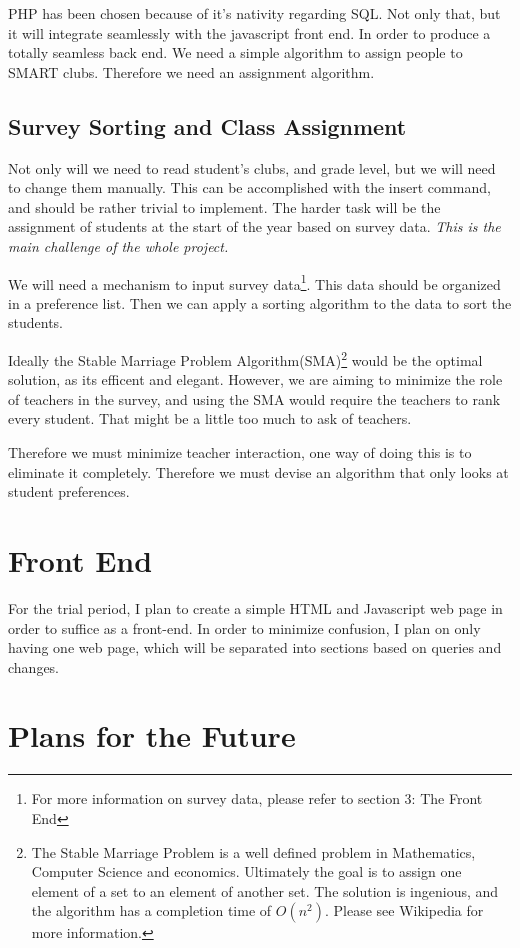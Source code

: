 \documentclass{article}
\begin{document}
PHP has been chosen because of it's nativity regarding SQL. Not only that, but it will integrate seamlessly with the javascript front end. In 
order to produce a totally seamless back end. We need a simple algorithm to assign people to SMART clubs. Therefore we need an assignment algorithm. 


\subsection{Survey Sorting and Class Assignment}
Not only will we need to read student's clubs, and grade level, but we will need to change them manually. This can be accomplished with the 
insert command, and should be rather trivial to implement. The harder task will be the assignment of students at the start of the year based on 
survey data. \emph{This is the main challenge of the whole project.}

We will need a mechanism to input survey data\footnote{For more information on survey data, please refer to section 3: The Front End}. This data should be 
organized in a preference list. Then we can apply a sorting algorithm to the data to sort the students. 

Ideally the Stable Marriage Problem Algorithm(SMA)\footnote{The Stable Marriage Problem is a well defined problem in Mathematics, Computer 
Science 
and economics. Ultimately the goal is to assign one element of a set to an element of another set. The solution is ingenious, and the algorithm 
has a completion time of $O(n^2)$. Please see Wikipedia for more information.} would be the optimal solution, as its efficent and elegant.
However, we are aiming to minimize the role of teachers in the survey, and using the SMA would require the teachers to rank every student. 
That might be a little too much to ask of teachers. 

Therefore we must minimize teacher interaction, one way of doing this is to eliminate it completely. Therefore we must devise an algorithm that only looks at student preferences. 
\section{Front End}
For the trial period, I plan to create a simple HTML and Javascript web page in order to suffice as a front-end. In order to minimize 
confusion, I plan on only having one web page, which will be separated into sections based on queries and changes. 
\section{Plans for the Future}
\end{document}

